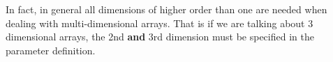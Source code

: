 In fact, in general all dimensions of higher order than one are needed
when dealing with multi-dimensional arrays. That is if we are talking
about 3 dimensional arrays, the 2nd \textbf{and} 3rd dimension must be
specified in the parameter definition.

\begin{comment}
\href{ch8x.htm}{Chapter 8: Pointers to Arrays}

\href{pointers.htm}{Back to Table of Contents}
\end{comment}
